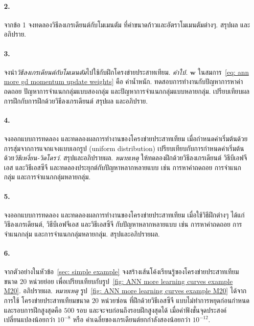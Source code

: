 \paragraph{2.} จากข้อ 1 จงทดลองวิธีลงเกรเดียนต์กับโมเมนตัม ที่ค่าขนาดก้าวและอัตราโมเมนตัมต่างๆ.
สรุปผล และอภิปราย.

\paragraph{3.} จงนำ\textit{วิธีลงเกรเดียนต์กับโมเมนตัม}ไปใช้กับฝึกโครงข่ายประสาทเทียม.
\emph{คำใบ้.} $\mathbf{w}$ ในสมการ~\ref{eq: ann more gd momentum update weights} คือ ค่าน้ำหนัก.
ทดสอบการทำงานกับปัญหาการหาค่าถดถอย ปัญหาการจำแนกกลุ่มแบบสองกลุ่ม และปัญหาการจำแนกกลุ่มแบบหลายกลุ่ม.
เปรียบเทียบผลการฝึกกับการฝึกด้วยวิธีลงเกรเดียนต์ สรุปผล และอภิปราย.

\paragraph{4.} จงออกแบบการทดลอง และทดลองผลการทำงานของโครงข่ายประสาทเทียม เมื่อกำหนดค่าเริ่มต้นด้วยการสุ่มจากการแจกแจงแบบเอกรูป (uniform distribution) 
เปรียบเทียบกับการกำหนดค่าเริ่มต้นด้วย\textit{วิธีเหงี่ยน-วิดโดรว์}.
สรุปและอภิปรายผล.
\emph{หมายเหตุ} ให้ทดลองฝึกด้วยวิธีลงเกรเดียนต์ วิธีบีเอฟจีเอส และวิธีเอสซีจี 
และทดลองประยุกต์กับปัญหาหลากหลายแบบ เช่น การหาค่าถดถอย การจำแนกกลุ่ม และการจำแนกกลุ่มหลายกลุ่ม.

\paragraph{5.} จงออกแบบการทดลอง และทดลองผลการทำงานของโครงข่ายประสาทเทียม 
เมื่อใช้วิธีฝึกต่างๆ ได้แก่ วิธีลงเกรเดียนต์, วิธีบีเอฟจีเอส และวิธีเอสซีจี กับปัญหาหลากหลายแบบ 
เช่น การหาค่าถดถอย การจำแนกกลุ่ม และการจำแนกกลุ่มหลายกลุ่ม.
สรุปและอภิปรายผล.

\paragraph{6.} จากตัวอย่างในหัวข้อ~\ref{sec: simple example} 
จงสร้างเส้นโค้งเรียนรู้ของโครงข่ายประสาทเทียมขนาด $20$ หน่วยย่อย 
เพื่อเปรียบเทียบกับรูป~\ref{fig: ANN more learning curves example M20}.
อภิปรายผล.
\emph{หมายเหตุ} รูป~\ref{fig: ANN more learning curves example M20} ได้จากการใช้ โครงข่ายประสาทเทียมขนาด $20$ หน่วยซ่อน ที่ฝึกด้วยวิธีเอสซีจี แบบไม่ทำการหยุดก่อนกำหนด และรอบการฝึกสูงสุดคือ $500$ รอบ และจะจบก่อนถึงรอบฝึกสูงสุดได้ เมื่อค่าฟังชั่นจุดประสงค์เปลี่ยนแปลงน้อยกว่า $10^{-8}$ หรือ ค่าเฉลี่ยของเกรเดียนต์ยกกำลังสองน้อยกว่า $10^{-12}$.

